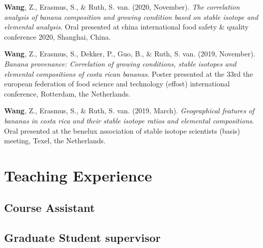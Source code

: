 \documentclass[11pt, a4paper]{awesome-cv}
\begin{document}
\begingroup
\setlength{\parindent}{-0.5in}
\setlength{\leftskip}{0.5in}

\hypertarget{refs_presentations}{}
\leavevmode\hypertarget{ref-wang_mind-wandering_2020}{}%
\textbf{Wang}, Z., Erasmus, S., \& Ruth, S. van. (2020, November).
\emph{The correlation analysis of banana composition and growing
condition based on stable isotope and elemental analysis}. Oral
presented at china international food safety \& quality conference 2020,
Shanghai, China.

\leavevmode\hypertarget{ref-wang_banana_2019}{}%
\textbf{Wang}, Z., Erasmus, S., Dekker, P., Guo, B., \& Ruth, S. van.
(2019, November). \emph{Banana provenance: Correlation of growing
conditions, stable isotopes and elemental compositions of costa rican
bananas}. Poster presented at the 33rd the european federation of food
science and technology (effost) international conference, Rotterdam, the
Netherlands.

\leavevmode\hypertarget{ref-wang_scan-geographical_2019}{}%
\textbf{Wang}, Z., Erasmus, S., \& Ruth, S. van. (2019, March).
\emph{Geographical features of bananas in costa rica and their stable
isotope ratios and elemental compositions}. Oral presented at the
benelux association of stable isotope scientists (basis) meeting, Texel,
the Netherlands.

\endgroup

\hypertarget{teaching-experience}{%
\section{Teaching Experience}\label{teaching-experience}}

\hypertarget{course-assistant}{%
\subsection{Course Assistant}\label{course-assistant}}

\begin{cventries}
\end{cventries}

\hypertarget{graduate-student-supervisor}{%
\subsection{Graduate Student
supervisor}\label{graduate-student-supervisor}}
\end{document}
